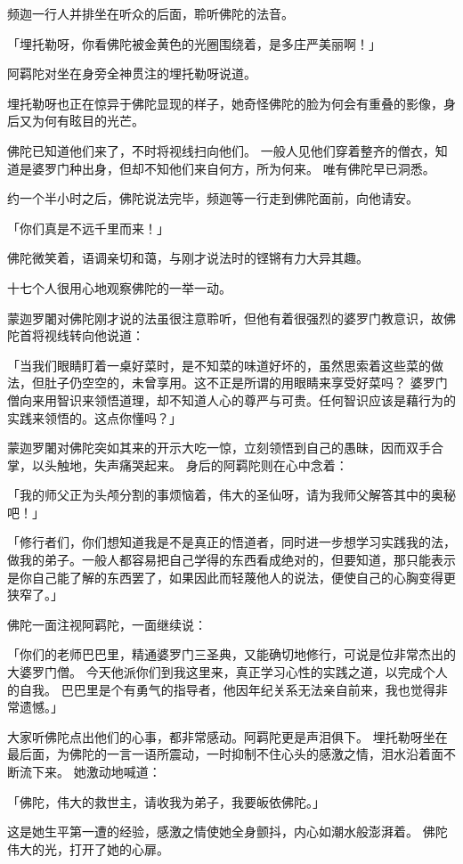 \documentclass[twoside,openany]{book}
\begin{document}
频迦一行人并排坐在听众的后面，聆听佛陀的法音。

「埋托勒呀，你看佛陀被金黄色的光圈围绕着，是多庄严美丽啊！」

阿羁陀对坐在身旁全神贯注的埋托勒呀说道。

埋托勒呀也正在惊异于佛陀显现的样子，她奇怪佛陀的脸为何会有重叠的影像，身后又为何有眩目的光芒。

佛陀已知道他们来了，不时将视线扫向他们。
一般人见他们穿着整齐的僧衣，知道是婆罗门种出身，但却不知他们来自何方，所为何来。
唯有佛陀早已洞悉。

约一个半小时之后，佛陀说法完毕，频迦等一行走到佛陀面前，向他请安。

「你们真是不远千里而来！」

佛陀微笑着，语调亲切和蔼，与刚才说法时的铿锵有力大异其趣。

十七个人很用心地观察佛陀的一举一动。

蒙迦罗闍对佛陀刚才说的法虽很注意聆听，但他有着很强烈的婆罗门教意识，故佛陀首将视线转向他说道：

「当我们眼睛盯着一桌好菜时，是不知菜的味道好坏的，虽然思索着这些菜的做法，但肚子仍空空的，未曾享用。这不正是所谓的用眼睛来享受好菜吗？
婆罗门僧向来用智识来领悟道理，却不知道人心的尊严与可贵。任何智识应该是藉行为的实践来领悟的。这点你懂吗？」

蒙迦罗闍对佛陀突如其来的开示大吃一惊，立刻领悟到自己的愚昧，因而双手合掌，以头触地，失声痛哭起来。
身后的阿羁陀则在心中念着：

「我的师父正为头颅分割的事烦恼着，伟大的圣仙呀，请为我师父解答其中的奥秘吧！」

「修行者们，你们想知道我是不是真正的悟道者，同时进一步想学习实践我的法，做我的弟子。一般人都容易把自己学得的东西看成绝对的，但要知道，那只能表示是你自己能了解的东西罢了，如果因此而轻蔑他人的说法，便使自己的心胸变得更狭窄了。」

佛陀一面注视阿羁陀，一面继续说：

「你们的老师巴巴里，精通婆罗门三圣典，又能确切地修行，可说是位非常杰出的大婆罗门僧。
今天他派你们到我这里来，真正学习心性的实践之道，以完成个人的自我。
巴巴里是个有勇气的指导者，他因年纪关系无法亲自前来，我也觉得非常遗憾。」

大家听佛陀点出他们的心事，都非常感动。阿羁陀更是声泪俱下。
埋托勒呀坐在最后面，为佛陀的一言一语所震动，一时抑制不住心头的感激之情，泪水沿着面不断流下来。
她激动地喊道：

「佛陀，伟大的救世主，请收我为弟子，我要皈依佛陀。」

这是她生平第一遭的经验，感激之情使她全身颤抖，内心如潮水般澎湃着。
佛陀伟大的光，打开了她的心扉。
\end{document}

